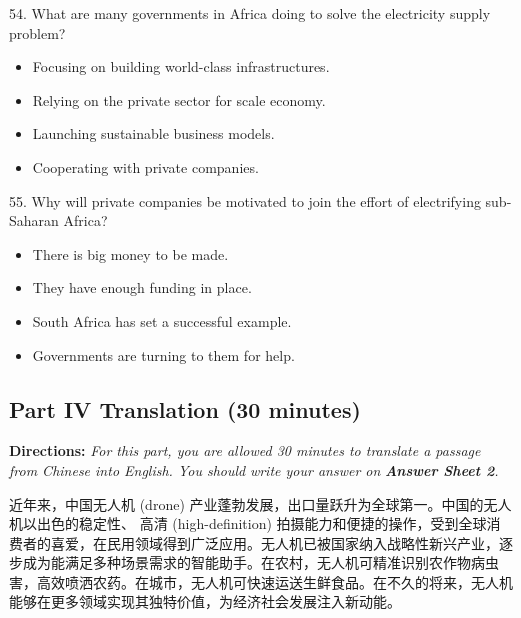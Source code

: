 \documentclass[UTF8,11pt]{ctexart}
\begin{document}
54. What are many governments in Africa doing to solve the electricity supply problem?


\begin{itemize}[leftmargin=2em,itemsep=.2em,topsep=.4em]\item[A.] Focusing on building world-class infrastructures.
\item[B.] Relying on the private sector for scale economy.
\item[C.] Launching sustainable business models.
\item[D.] Cooperating with private companies.
\end{itemize}

55. Why will private companies be motivated to join the effort of electrifying sub-Saharan Africa?


\begin{itemize}[leftmargin=2em,itemsep=.2em,topsep=.4em]\item[A.] There is big money to be made.
\item[B.] They have enough funding in place.
\item[C.] South Africa has set a successful example.
\item[D.] Governments are turning to them for help.
\end{itemize}

\subsection*{\textbf{Part IV Translation} \textbf{(30 minutes)}}


\textbf{Directions: }\textit{For this part, you are allowed 30 minutes to translate a passage from Chinese into English. You should} \textit{write your answer on }\textbf{\textit{Answer Sheet 2}}\textit{.}


近年来，中国无人机 (drone) 产业蓬勃发展，出口量跃升为全球第一。中国的无人机以出色的稳定性、 高清 (high-definition) 拍摄能力和便捷的操作，受到全球消费者的喜爱，在民用领域得到广泛应用。无人机已被国家纳入战略性新兴产业，逐步成为能满足多种场景需求的智能助手。在农村，无人机可精准识别农作物病虫害，高效喷洒农药。在城市，无人机可快速运送生鲜食品。在不久的将来，无人机能够在更多领域实现其独特价值，为经济社会发展注入新动能。
\end{document}
